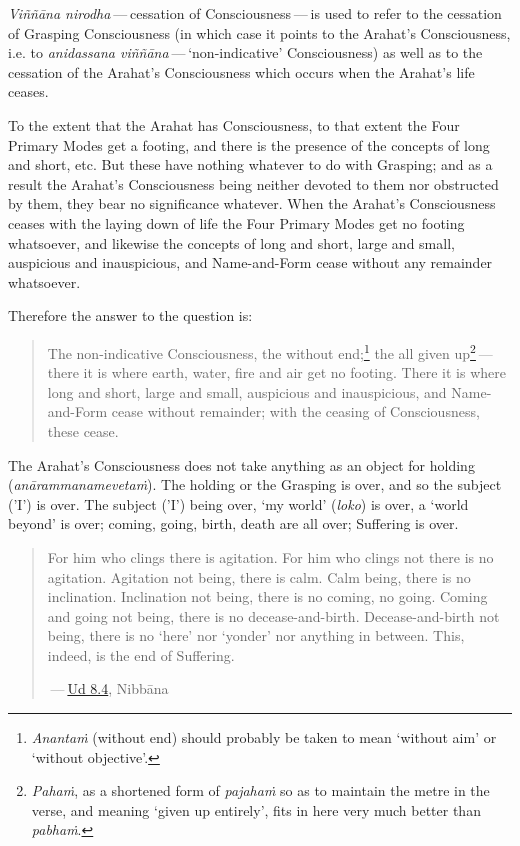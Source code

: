 \emph{Viññāna nirodha} --- cessation of Consciousness --- is used to refer to the cessation of Grasping Consciousness (in which case it points to the Arahat's Consciousness, i.e. to \emph{anidassana viññāna} --- `non-indicative' Consciousness) as well as to the cessation of the Arahat's Consciousness which occurs when the Arahat's life ceases.

To the extent that the Arahat has Consciousness, to that extent the Four Primary Modes get a footing, and there is the presence of the concepts of long and short, etc. But these have nothing whatever to do with Grasping; and as a result the Arahat's Consciousness being neither devoted to them nor obstructed by them, they bear no significance whatever. When the Arahat's Consciousness ceases with the laying down of life the Four Primary Modes get no footing whatsoever, and likewise the concepts of long and short, large and small, auspicious and inauspicious, and Name-and-Form cease without any remainder whatsoever.

Therefore the answer to the question is:

\begin{quote}
The non-indicative Consciousness, the without end;\footnote{\emph{Anantaṁ} (without end) should probably be taken to mean `without aim' or `without objective'.} the all given up\footnote{\emph{Pahaṁ}, as a shortened form of \emph{pajahaṁ} so as to maintain the metre in the verse, and meaning `given up entirely', fits in here very much better than \emph{pabhaṁ}.} --- there it is where earth, water, fire and air get no footing. There it is where long and short, large and small, auspicious and inauspicious, and Name-and-Form cease without remainder; with the ceasing of Consciousness, these cease.
\end{quote}

The Arahat's Consciousness does not take anything as an object for holding (\emph{anārammanamevetaṁ}). The holding or the Grasping is over, and so the subject ('I') is over. The subject ('I') being over, `my world' (\emph{loko}) is over, a `world beyond' is over; coming, going, birth, death are all over; Suffering is over.

\begin{quote}
For him who clings there is agitation. For him who clings not there is no agitation. Agitation not being, there is calm. Calm being, there is no inclination. Inclination not being, there is no coming, no going. Coming and going not being, there is no decease-and-birth. Decease-and-birth not being, there is no `here' nor `yonder' nor anything in between. This, indeed, is the end of Suffering.

 --- \href{https://suttacentral.net/ud8.4/en/anandajoti}{Ud 8.4}, Nibbāna
\end{quote}

